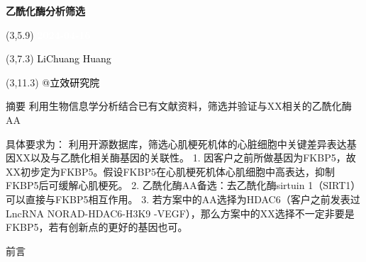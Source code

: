 \documentclass[
  ignorenonframetext,
]{beamer}
\author{}
\date{\vspace{-2.5em}}
\begin{document}
\begin{frame}
\begin{titlepage} 
\begin{center} \textbf{\Huge 乙酰化酶分析筛选}
\vspace{4em} \begin{textblock}{10}(3,5.9) \huge
\textbf{\textcolor{white}{2024-04-16}}
\end{textblock} \begin{textblock}{10}(3,7.3)
\Large \textcolor{black}{LiChuang Huang}
\end{textblock} \begin{textblock}{10}(3,11.3)
\Large \textcolor{black}{@立效研究院}
\end{textblock} \end{center} \end{titlepage}
\restoregeometry


\tableofcontents

\listoffigures

\listoftables



\end{frame}

\begin{frame}{摘要}
\protect\hypertarget{abstract}{}
利用生物信息学分析结合已有文献资料，筛选并验证与XX相关的乙酰化酶AA

具体要求为：
利用开源数据库，筛选心肌梗死机体的心脏细胞中关键差异表达基因XX以及与乙酰化相关酶基因的关联性。
1.
因客户之前所做基因为FKBP5，故XX初步定为FKBP5。假设FKBP5在心肌梗死机体心肌细胞中高表达，抑制FKBP5后可缓解心肌梗死。
2. 乙酰化酶AA备选：去乙酰化酶sirtuin 1（SIRT1）可以直接与FKBP5相互作用。
3. 若方案中的AA选择为HDAC6（客户之前发表过LncRNA NORAD-HDAC6-H3K9
-VEGF），那么方案中的XX选择不一定非要是FKBP5，若有创新点的更好的基因也可。
\end{frame}

\begin{frame}{前言}
\protect\hypertarget{introduction}{}
\end{frame}
\end{document}
